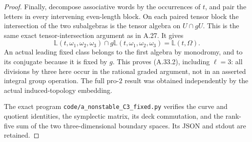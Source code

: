 \begin{proof}
Finally, decompose associative words by the
occurrences of $t$, and pair the letters
in every intervening even-length block.
On each paired tensor block the intersection
of the two subalgebras is the tensor algebra
on $U\cap gU$. This is the same exact
tensor-intersection argument as in A.27.
It gives
\[
 \mathbb L(t,\omega_1,\omega_2,\omega_3)
       \cap g\mathbb L(t,\omega_1,\omega_2,\omega_3)
                      =\mathbb L(t,\Omega).
\]
An actual leading fixed class belongs to the
first algebra by monodromy, and to its
conjugate because it is fixed by $g$.
This proves (A.33.2), including $\ell=3$:
all divisions by three here occur in the
rational graded argument, not in an asserted
integral group operation. The full pro-$2$
result was obtained independently by the
actual induced-topology embedding.

The exact program
\texttt{code/a\_nonstable\_C3\_fixed.py} verifies
the curve and quotient identities, the
symplectic matrix, its deck commutation,
and the rank-five sum of the two
three-dimensional boundary spaces.
Its JSON and stdout are retained.
\end{proof}
